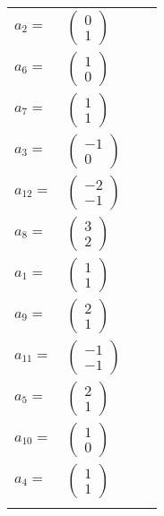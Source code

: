 \documentclass[1p]{elsarticle_modified}
\theoremstyle{definition}
\begin{document}
\begin{tabular}{m{7pt} m{180pt} m{7pt} m{180pt} }
\flushright $a_{2}=$&$\begin{pmatrix}0\\1\end{pmatrix}$ \\
\flushright $a_{6}=$&$\begin{pmatrix}1\\0\end{pmatrix}$ \\
\flushright $a_{7}=$&$\begin{pmatrix}1\\1\end{pmatrix}$ \\
\flushright $a_{3}=$&$\begin{pmatrix}-1\\0\end{pmatrix}$ \\
\flushright $a_{12}=$&$\begin{pmatrix}-2\\-1\end{pmatrix}$ \\
\flushright $a_{8}=$&$\begin{pmatrix}3\\2\end{pmatrix}$ \\
\flushright $a_{1}=$&$\begin{pmatrix}1\\1\end{pmatrix}$ \\
\flushright $a_{9}=$&$\begin{pmatrix}2\\1\end{pmatrix}$ \\
\flushright $a_{11}=$&$\begin{pmatrix}-1\\-1\end{pmatrix}$ \\
\flushright $a_{5}=$&$\begin{pmatrix}2\\1\end{pmatrix}$ \\
\flushright $a_{10}=$&$\begin{pmatrix}1\\0\end{pmatrix}$ \\
\flushright $a_{4}=$&$\begin{pmatrix}1\\1\end{pmatrix}$\\&\end{tabular}
\end{document}
